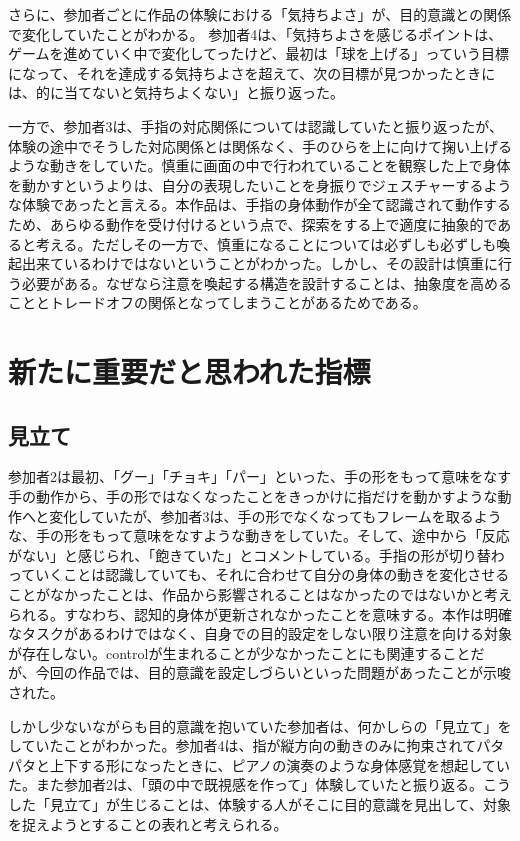 さらに、参加者ごとに作品の体験における「気持ちよさ」が、目的意識との関係で変化していたことがわかる。
参加者4は、「気持ちよさを感じるポイントは、ゲームを進めていく中で変化してったけど、最初は「球を上げる」っていう目標になって、それを達成する気持ちよさを超えて、次の目標が見つかったときには、的に当てないと気持ちよくない」と振り返った。

一方で、参加者3は、手指の対応関係については認識していたと振り返ったが、体験の途中でそうした対応関係とは関係なく、手のひらを上に向けて掬い上げるような動きをしていた。慎重に画面の中で行われていることを観察した上で身体を動かすというよりは、自分の表現したいことを身振りでジェスチャーするような体験であったと言える。本作品は、手指の身体動作が全て認識されて動作するため、あらゆる動作を受け付けるという点で、探索をする上で適度に抽象的であると考える。ただしその一方で、慎重になることについては必ずしも必ずしも喚起出来ているわけではないということがわかった。しかし、その設計は慎重に行う必要がある。なぜなら注意を喚起する構造を設計することは、抽象度を高めることとトレードオフの関係となってしまうことがあるためである。

\section{新たに重要だと思われた指標}
\subsection{見立て}
参加者2は最初、「グー」「チョキ」「パー」といった、手の形をもって意味をなす手の動作から、手の形ではなくなったことをきっかけに指だけを動かすような動作へと変化していたが、参加者3は、手の形でなくなってもフレームを取るような、手の形をもって意味をなすような動きをしていた。そして、途中から「反応がない」と感じられ、「飽きていた」とコメントしている。手指の形が切り替わっていくことは認識していても、それに合わせて自分の身体の動きを変化させることがなかったことは、作品から影響されることはなかったのではないかと考えられる。すなわち、認知的身体が更新されなかったことを意味する。本作は明確なタスクがあるわけではなく、自身での目的設定をしない限り注意を向ける対象が存在しない。controlが生まれることが少なかったことにも関連することだが、今回の作品では、目的意識を設定しづらいといった問題があったことが示唆された。

しかし少ないながらも目的意識を抱いていた参加者は、何かしらの「見立て」をしていたことがわかった。参加者4は、指が縦方向の動きのみに拘束されてパタパタと上下する形になったときに、ピアノの演奏のような身体感覚を想起していた。また参加者2は、「頭の中で既視感を作って」体験していたと振り返る。こうした「見立て」が生じることは、体験する人がそこに目的意識を見出して、対象を捉えようとすることの表れと考えられる。

